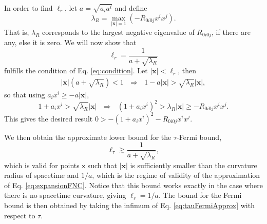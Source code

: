 \documentclass[prd,twocolumn,superscriptaddress,floatfix,amsmath,amssymb,amsfonts,longbibliography,nofootinbib]{revtex4-1}
\newcommand{\mf}{\mathsf}%
\begin{document}
In order to find $\ell_r$, let $a = \sqrt{a_ia^i}$ and define
\begin{equation}
    \lambda_R = \max_{|\bm x| = 1}\left(-R_{0i0j}x^ix^j\right).
\end{equation}
That is, $\lambda_R$ corresponds to the largest negative eigenvalue of $R_{0i0j}$, if there are any, else it is zero. We will now show that
\begin{equation}
    \ell_r = \frac{1}{a+\sqrt{\lambda_R}}
\end{equation}
fulfills the condition of Eq. \eqref{eq:condition}. Let $|\bm x|<\ell_r$, then
\begin{align}
    |\bm x|(a + \sqrt{\lambda_R})<1 \:\:\:\Rightarrow\:\:\: 1 - a|\bm x| >\sqrt{\lambda_R}|\bm x|,
\end{align}
so that using $a_i x^i \geq -a |\bm x|$,
\begin{equation}\label{eq:noname}
    1 + a_i x^i> \sqrt{\lambda_R} |\bm x| \:\:\:\Rightarrow\:\:\: (1 + a_i x^i)^2 > \lambda_R |\bm x| \geq - R_{0i0j}x^i x^j.
\end{equation}
This gives the desired result $0>-(1 + a_i x^i)^2- R_{0i0j}x^i x^j$.

We then obtain the approximate lower bound for the $\tau$-Fermi bound,
\begin{equation}\label{eq:tauFermiApprox}
    \ell_\tau \gtrsim \frac{1}{a+\sqrt{\lambda_R}},
\end{equation}
which is valid for points $\mf x$ such that $|\bm x|$ is sufficiently smaller than the curvature radius of spacetime and $1/a$, which is the regime of validity of the approximation of Eq. \eqref{eq:expansionFNC}. Notice that this bound works exactly in the case where there is no spacetime curvature, giving \mbox{$\ell_r = 1/a$}. The bound for the Fermi bound is then obtained by taking the infimum of Eq. \eqref{eq:tauFermiApprox} with respect to $\tau$.



\end{document}
